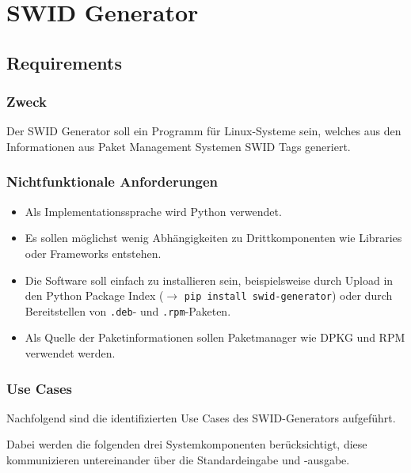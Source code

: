 \chapter{SWID Generator}


\section{Requirements}

\subsection{Zweck}

Der SWID Generator soll ein Programm für Linux-Systeme sein, welches aus den
Informationen aus Paket Management Systemen SWID Tags generiert.

\subsection{Nichtfunktionale Anforderungen}

\begin{itemize}
	\item Als Implementationssprache wird Python verwendet.
	\item Es sollen möglichst wenig Abhängigkeiten zu Drittkomponenten wie
		Libraries oder Frameworks entstehen.
	\item Die Software soll einfach zu installieren sein, beispielsweise durch
		Upload in den Python Package Index ($\rightarrow$ \texttt{pip install
		swid-generator}) oder durch Bereitstellen von \texttt{.deb}- und
		\texttt{.rpm}-Paketen.
	\item Als Quelle der Paketinformationen sollen Paketmanager wie DPKG und RPM
		verwendet werden.
\end{itemize}

\subsection{Use Cases}

Nachfolgend sind die identifizierten Use Cases des SWID-Generators aufgeführt.

Dabei werden die folgenden drei Systemkomponenten berücksichtigt, diese
kommunizieren untereinander über die Standardeingabe und -ausgabe.

\vspace{1em}

